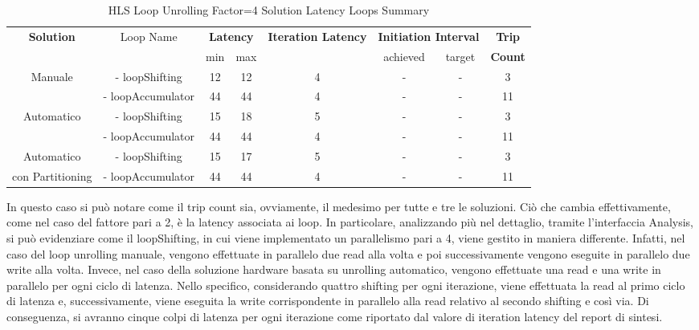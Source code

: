 \begin{table}[H]
    \centering
    \begin{tabular}{|c|c|c|c|c|c|c|c|}
        \hline
        \multicolumn{1}{|c|}{\textbf{Solution}} & \multicolumn{1}{|c|}{Loop Name} & \multicolumn{2}{|c|}{\textbf{Latency}} & \multicolumn{1}{c|}{\textbf{Iteration Latency}} & \multicolumn{2}{c|}{\textbf{Initiation Interval}} & \multicolumn{1}{c|}{\textbf{Trip}}  \\
        &  & min & max &  & achieved & target & \textbf{Count} \\
        \hline
        Manuale & - loopShifting & 12 & 12 & 4 & - & - & 3 \\
        & - loopAccumulator & 44 & 44 & 4 & - & - & 11 \\
        \hline
        Automatico & - loopShifting & 15 & 18 & 5  & - & - & 3 \\
        & - loopAccumulator & 44 & 44 & 4 & - & - & 11 \\
        \hline
        Automatico  & - loopShifting & 15 & 17 & 5  & - & - & 3 \\
        con Partitioning & - loopAccumulator & 44 & 44 & 4  & - & - & 11 \\
        \hline
    \end{tabular}
    \caption{HLS Loop Unrolling Factor=4 Solution Latency Loops Summary }
    \label{tab:hls-loop-unrolling-factor4-solution-loop-summary}
\end{table}

In questo caso si può notare come il trip count sia, ovviamente, il medesimo per tutte e tre le soluzioni. Ciò che cambia effettivamente, come nel caso del fattore pari a 2, è la latency associata ai loop. In particolare, analizzando più nel dettaglio, tramite l'interfaccia Analysis, si può evidenziare come il loopShifting, in cui viene implementato un parallelismo pari a 4, viene gestito in maniera differente. Infatti, nel caso del loop unrolling manuale, vengono effettuate in parallelo due read alla volta e poi successivamente vengono eseguite in parallelo due write alla volta. Invece, nel caso della soluzione hardware basata su unrolling automatico, vengono effettuate una read e una write in parallelo per ogni ciclo di latenza. Nello specifico, considerando quattro shifting per ogni iterazione, viene effettuata la read al primo ciclo di latenza e, successivamente, viene eseguita la write corrispondente in parallelo alla read relativo al secondo shifting e così via. Di conseguenza, si avranno cinque colpi di latenza per ogni iterazione come riportato dal valore di iteration latency del report di sintesi.

